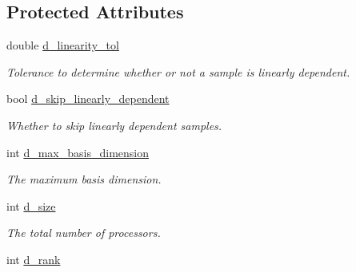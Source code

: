 \subsection*{Protected Attributes}
\begin{DoxyCompactItemize}
\item 
\hypertarget{class_c_a_r_o_m_1_1_incremental_s_v_d_a3c49e9496b716f451d54e2d2a924717c}{double \hyperlink{class_c_a_r_o_m_1_1_incremental_s_v_d_a3c49e9496b716f451d54e2d2a924717c}{d\-\_\-linearity\-\_\-tol}}\label{class_c_a_r_o_m_1_1_incremental_s_v_d_a3c49e9496b716f451d54e2d2a924717c}

\begin{DoxyCompactList}\small\item\em Tolerance to determine whether or not a sample is linearly dependent. \end{DoxyCompactList}\item 
\hypertarget{class_c_a_r_o_m_1_1_incremental_s_v_d_acec4759c97fae19fe5c468df7d6bab7c}{bool \hyperlink{class_c_a_r_o_m_1_1_incremental_s_v_d_acec4759c97fae19fe5c468df7d6bab7c}{d\-\_\-skip\-\_\-linearly\-\_\-dependent}}\label{class_c_a_r_o_m_1_1_incremental_s_v_d_acec4759c97fae19fe5c468df7d6bab7c}

\begin{DoxyCompactList}\small\item\em Whether to skip linearly dependent samples. \end{DoxyCompactList}\item 
\hypertarget{class_c_a_r_o_m_1_1_incremental_s_v_d_a585fb78a9a58093014220a4e09ae176d}{int \hyperlink{class_c_a_r_o_m_1_1_incremental_s_v_d_a585fb78a9a58093014220a4e09ae176d}{d\-\_\-max\-\_\-basis\-\_\-dimension}}\label{class_c_a_r_o_m_1_1_incremental_s_v_d_a585fb78a9a58093014220a4e09ae176d}

\begin{DoxyCompactList}\small\item\em The maximum basis dimension. \end{DoxyCompactList}\item 
\hypertarget{class_c_a_r_o_m_1_1_incremental_s_v_d_aa208876f1ac66ab10a2be9b0d27f021a}{int \hyperlink{class_c_a_r_o_m_1_1_incremental_s_v_d_aa208876f1ac66ab10a2be9b0d27f021a}{d\-\_\-size}}\label{class_c_a_r_o_m_1_1_incremental_s_v_d_aa208876f1ac66ab10a2be9b0d27f021a}

\begin{DoxyCompactList}\small\item\em The total number of processors. \end{DoxyCompactList}\item 
\hypertarget{class_c_a_r_o_m_1_1_incremental_s_v_d_aeb9834edb3a0424ae3c930945831228d}{int \hyperlink{class_c_a_r_o_m_1_1_incremental_s_v_d_aeb9834edb3a0424ae3c930945831228d}{d\-\_\-rank}}\label{class_c_a_r_o_m_1_1_incremental_s_v_d_aeb9834edb3a0424ae3c930945831228d}


\end{DoxyCompactItemize}
